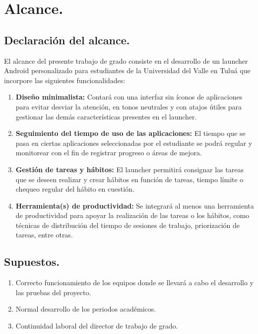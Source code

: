 \section{Alcance.}	

\subsection{Declaración del alcance.}

El alcance del presente trabajo de grado consiste en el desarrollo de un launcher Android personalizado para estudiantes de la Universidad del Valle en Tuluá que incorpore las siguientes funcionalidades: 

\begin{enumerate}
    \item \textbf{Diseño minimalista:} Contará con una interfaz sin íconos de aplicaciones para evitar desviar la atención, en tonos neutrales y con atajos útiles para gestionar las demás características presentes en el launcher.
    \item \textbf{Seguimiento del tiempo de uso de las aplicaciones:} El tiempo que se pasa en ciertas aplicaciones seleccionadas por el estudiante se podrá regular y monitorear con el fin de registrar progreso o áreas de mejora.
    \item \textbf{Gestión de tareas y hábitos:} El launcher permitirá consignar las tareas que se deseen realizar y crear hábitos en función de tareas, tiempo límite o chequeo regular del hábito en cuestión.
    \item \textbf{Herramienta(s) de productividad:} Se integrará al menos una herramienta de productividad para apoyar la realización de las tareas o los hábitos, como técnicas de distribución del tiempo de sesiones de trabajo, priorización de tareas, entre otras.
\end{enumerate}


\subsection{Supuestos.}

\begin{enumerate}
    \item Correcto funcionamiento de los equipos donde se llevará a cabo el desarrollo y las pruebas del proyecto. 
    \item Normal desarrollo de los periodos académicos.
    \item Continuidad laboral del director de trabajo de grado.
\end{enumerate}

